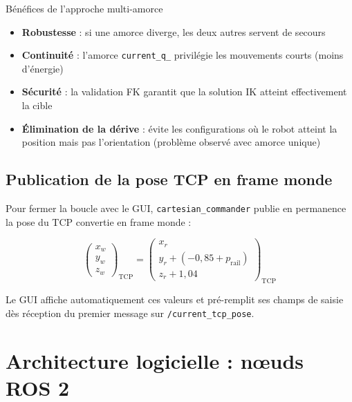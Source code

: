 \documentclass[11pt, a4paper]{article}
\newcommand{\topic}[1]{\texttt{\color{AccentOrange}#1}}
\begin{document}
\begin{keybox}{Bénéfices de l'approche multi-amorce}
\begin{itemize}[leftmargin=1em, itemsep=2pt]
  \item \textbf{Robustesse} : si une amorce diverge, les deux autres servent de secours
  \item \textbf{Continuité} : l'amorce \texttt{current\_q\_} privilégie les mouvements courts (moins d'énergie)
  \item \textbf{Sécurité} : la validation FK garantit que la solution IK atteint effectivement la cible
  \item \textbf{Élimination de la dérive} : évite les configurations où le robot atteint la position mais pas l'orientation (problème observé avec amorce unique)
\end{itemize}
\end{keybox}

\subsection{Publication de la pose TCP en frame monde}

Pour fermer la boucle avec le GUI, \texttt{cartesian\_commander} publie en permanence la pose du TCP convertie en frame monde :

\begin{equation}
  \begin{pmatrix} x_w \\ y_w \\ z_w \end{pmatrix}_{\text{TCP}}
  =
  \begin{pmatrix} x_r \\ y_r + (-0{,}85 + p_{\text{rail}}) \\ z_r + 1{,}04 \end{pmatrix}_{\text{TCP}}
\end{equation}

Le GUI affiche automatiquement ces valeurs et pré-remplit ses champs de saisie dès réception du premier message sur \topic{/current\_tcp\_pose}.

\section{Architecture logicielle : nœuds ROS 2}
\end{document}

